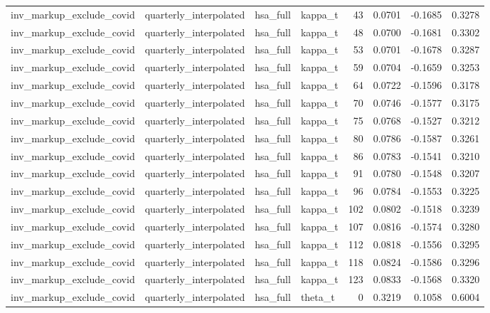 \begin{tabular}{llllrrrr}
inv\_markup\_exclude\_covid & quarterly\_interpolated & hsa\_full & kappa\_t & 43 & 0.0701 & -0.1685 & 0.3278 \\
inv\_markup\_exclude\_covid & quarterly\_interpolated & hsa\_full & kappa\_t & 48 & 0.0700 & -0.1681 & 0.3302 \\
inv\_markup\_exclude\_covid & quarterly\_interpolated & hsa\_full & kappa\_t & 53 & 0.0701 & -0.1678 & 0.3287 \\
inv\_markup\_exclude\_covid & quarterly\_interpolated & hsa\_full & kappa\_t & 59 & 0.0704 & -0.1659 & 0.3253 \\
inv\_markup\_exclude\_covid & quarterly\_interpolated & hsa\_full & kappa\_t & 64 & 0.0722 & -0.1596 & 0.3178 \\
inv\_markup\_exclude\_covid & quarterly\_interpolated & hsa\_full & kappa\_t & 70 & 0.0746 & -0.1577 & 0.3175 \\
inv\_markup\_exclude\_covid & quarterly\_interpolated & hsa\_full & kappa\_t & 75 & 0.0768 & -0.1527 & 0.3212 \\
inv\_markup\_exclude\_covid & quarterly\_interpolated & hsa\_full & kappa\_t & 80 & 0.0786 & -0.1587 & 0.3261 \\
inv\_markup\_exclude\_covid & quarterly\_interpolated & hsa\_full & kappa\_t & 86 & 0.0783 & -0.1541 & 0.3210 \\
inv\_markup\_exclude\_covid & quarterly\_interpolated & hsa\_full & kappa\_t & 91 & 0.0780 & -0.1548 & 0.3207 \\
inv\_markup\_exclude\_covid & quarterly\_interpolated & hsa\_full & kappa\_t & 96 & 0.0784 & -0.1553 & 0.3225 \\
inv\_markup\_exclude\_covid & quarterly\_interpolated & hsa\_full & kappa\_t & 102 & 0.0802 & -0.1518 & 0.3239 \\
inv\_markup\_exclude\_covid & quarterly\_interpolated & hsa\_full & kappa\_t & 107 & 0.0816 & -0.1574 & 0.3280 \\
inv\_markup\_exclude\_covid & quarterly\_interpolated & hsa\_full & kappa\_t & 112 & 0.0818 & -0.1556 & 0.3295 \\
inv\_markup\_exclude\_covid & quarterly\_interpolated & hsa\_full & kappa\_t & 118 & 0.0824 & -0.1586 & 0.3296 \\
inv\_markup\_exclude\_covid & quarterly\_interpolated & hsa\_full & kappa\_t & 123 & 0.0833 & -0.1568 & 0.3320 \\
inv\_markup\_exclude\_covid & quarterly\_interpolated & hsa\_full & theta\_t & 0 & 0.3219 & 0.1058 & 0.6004 \\

\end{tabular}
